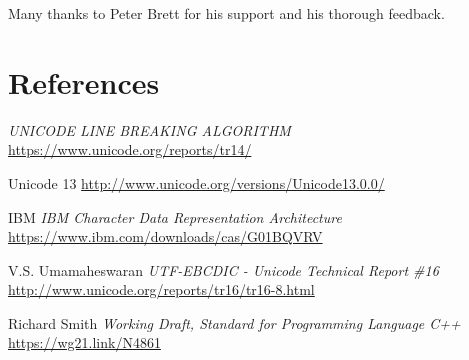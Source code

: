 \documentclass{wg21}
\begin{document}
Many thanks to Peter Brett for his support and his thorough feedback.
\section{References}
\renewcommand{\section}[2]{}%



\begin{thebibliography}{9}

    \emph{UNICODE LINE BREAKING ALGORITHM}\newline
    \url{https://www.unicode.org/reports/tr14/}

    Unicode 13\newline
    \url{http://www.unicode.org/versions/Unicode13.0.0/}

    IBM\newline
    \emph{IBM Character Data Representation Architecture}\newline
    \url{https://www.ibm.com/downloads/cas/G01BQVRV}


    V.S. Umamaheswaran\newline
    \emph{UTF-EBCDIC - Unicode Technical Report \#16}\newline
    \url{http://www.unicode.org/reports/tr16/tr16-8.html}

    Richard Smith
    \emph{Working Draft, Standard for Programming Language C++}\newline
    \url{https://wg21.link/N4861}

\end{thebibliography}
\end{document}
